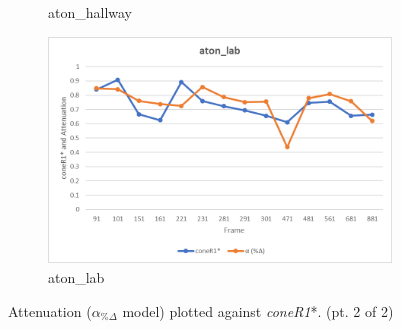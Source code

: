 \begin{appendices}
\begin{figure}
\begin{subfigure}{.45\linewidth}
  \caption{aton\_hallway}
\end{subfigure}
\hfill
\begin{subfigure}{.45\linewidth}
  \includegraphics[width=1\linewidth]{figures/appendix/lab_rgb.jpg}
  \caption{aton\_lab}
\end{subfigure}

\caption{Attenuation ($\alpha_{\%\Delta}$ model) plotted against \textit{coneR1}*. (pt. 2 of 2)}
\end{figure}


\end{appendices}
